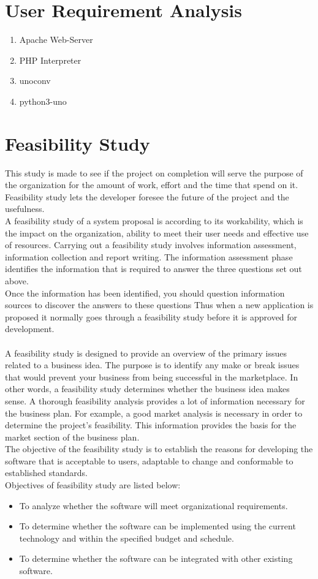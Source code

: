 \section{User Requirement Analysis}
\begin{enumerate}
\item Apache Web-Server
\item PHP Interpreter
\item unoconv
\item python3-uno
\end{enumerate}
\section{Feasibility Study}
This study is made to see if the project on completion will serve the purpose of the organization for the amount of work, effort and the time that spend on it. Feasibility study lets the developer foresee the future of the project and the usefulness.\\
A feasibility study of a system proposal is according to its workability, which is the impact on the organization, ability to meet their user needs and effective use of resources. Carrying out a feasibility study involves information assessment, information collection and report writing. The information assessment phase identifies the information that is required to answer the three questions set out above.\\
Once the information has been identified, you should question information sources to discover the answers to these questions Thus when a new application is proposed it normally goes through a feasibility study before it is approved for development.\\\\
A feasibility study is designed to provide an overview of the primary issues related to a business idea. The purpose is to identify any make or break issues that would prevent your business from being successful in the marketplace. In other words, a feasibility study determines whether the business idea makes sense. A thorough feasibility analysis provides a lot of information necessary for the business plan. For example, a good market analysis is necessary in order to determine the project's feasibility. This information provides the basis for the market section of the business plan.\\
The objective of the feasibility study is to establish the reasons for developing the software that is acceptable to users, adaptable to change and conformable to established standards.\\
Objectives of feasibility study are listed below:
\begin{itemize}
	\item To analyze whether the software will meet organizational requirements.
	\item To determine whether the software can be implemented using the current technology and within the specified budget and schedule.
	\item To determine whether the software can be integrated with other existing software.
\end{itemize}

